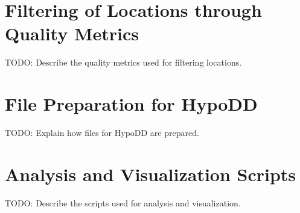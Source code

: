 \section{Filtering of Locations through Quality Metrics}
TODO: Describe the quality metrics used for filtering locations.

\section{File Preparation for HypoDD}
TODO: Explain how files for HypoDD are prepared.

\section{Analysis and Visualization Scripts}
TODO: Describe the scripts used for analysis and visualization.

